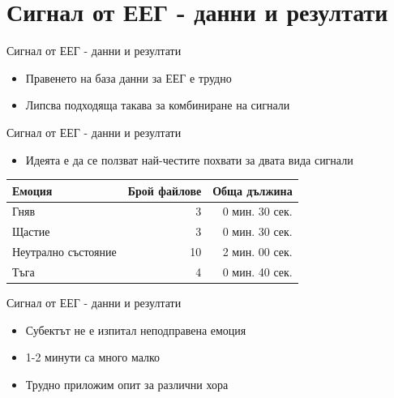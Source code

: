 \documentclass[9pt]{beamer}
\begin{document}
\section{Сигнал от ЕЕГ - данни и резултати}
    \begin{frame}[t]{Сигнал от ЕЕГ - данни и резултати}
        \begin{itemize}
            \setlength\itemsep{\fill}
            \pause
            \item Правенето на база данни за ЕЕГ е трудно
            \pause
            \item Липсва подходяща такава за комбиниране на сигнали
        \end{itemize}
    \end{frame}

    \begin{frame}[t]{Сигнал от ЕЕГ - данни и резултати}
        \begin{itemize}
            \setlength\itemsep{\fill}
            \pause
            \item Идеята е да се ползват най-честите похвати за двата вида сигнали
        \end{itemize}
        \pause
        \pause
        \begin{center}
        \begin{tabular}{|l|r|r|} 
            \hline
            Емоция & Брой файлове & Обща дължина\\ 
            \hline
            Гняв & 3 & 0 мин. 30 сек.\\ 
            Щастие & 3 & 0 мин. 30 сек.\\ 
            Неутрално състояние & 10 & 2 мин. 00 сек. \\ 
            Тъга & 4 & 0 мин. 40 сек. \\ 
            \hline
        \end{tabular}
        \end{center}
    \end{frame}

    \begin{frame}[t]{Сигнал от ЕЕГ - данни и резултати}
        \begin{itemize}
            \setlength\itemsep{\fill}
            \pause
            \item Субектът не е изпитал неподправена емоция
            \item 1-2 минути са много малко
            \item Трудно приложим опит за различни хора
        \end{itemize}
    \end{frame}
\end{document}
